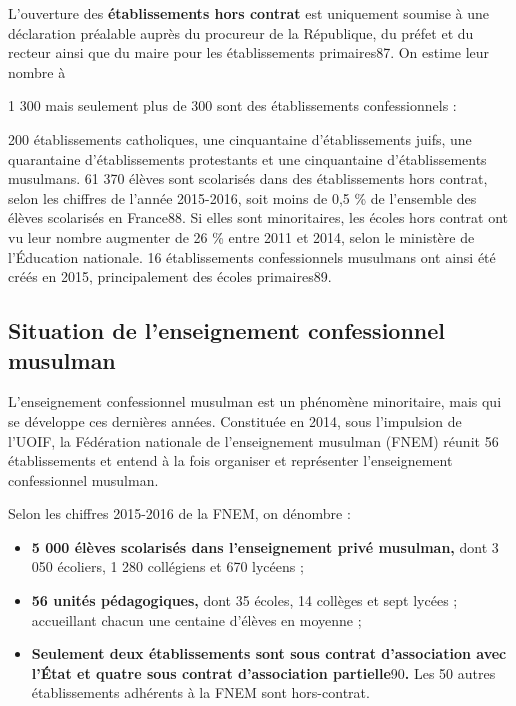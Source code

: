 L'ouverture des \textbf{établissements hors contrat} est uniquement
soumise à une déclaration préalable auprès du procureur de la
République, du préfet et du recteur ainsi que du maire pour les
établissements primaires87. On estime leur nombre à

1 300 mais seulement plus de 300 sont des établissements confessionnels
:

200 établissements catholiques, une cinquantaine d'établissements juifs,
une quarantaine d'établissements protestants et une cinquantaine
d'établissements musulmans. 61 370 élèves sont scolarisés dans des
établissements hors contrat, selon les chiffres de l'année 2015-2016,
soit moins de 0,5 \% de l'ensemble des élèves scolarisés en France88. Si
elles sont minoritaires, les écoles hors contrat ont vu leur nombre
augmenter de 26 \% entre 2011 et 2014, selon le ministère de l'Éducation
nationale. 16 établissements confessionnels musulmans ont ainsi été
créés en 2015, principalement des écoles primaires89.

\subsection{Situation de l'enseignement confessionnel musulman}

L'enseignement confessionnel musulman est un phénomène minoritaire, mais
qui se développe ces dernières années. Constituée en 2014, sous
l'impulsion de l'UOIF, la Fédération nationale de l'enseignement
musulman (FNEM) réunit 56 établissements et entend à la fois organiser
et représenter l'enseignement confessionnel musulman.

Selon les chiffres 2015-2016 de la FNEM, on dénombre :


\begin{itemize}
\item
  \textbf{5 000 élèves scolarisés dans l'enseignement privé musulman,}
  dont 3 050 écoliers, 1 280 collégiens et 670 lycéens ;
\item
  \textbf{56 unités pédagogiques,} dont 35 écoles, 14 collèges et sept
  lycées ; accueillant chacun une centaine d'élèves en moyenne ;
\end{itemize}

\begin{itemize}
\item
  \textbf{Seulement deux établissements sont sous contrat d'association
  avec l'État et quatre sous contrat d'association
  partielle}90\textbf{.} Les 50 autres établissements adhérents à la
  FNEM sont hors-contrat.
\end{itemize}

